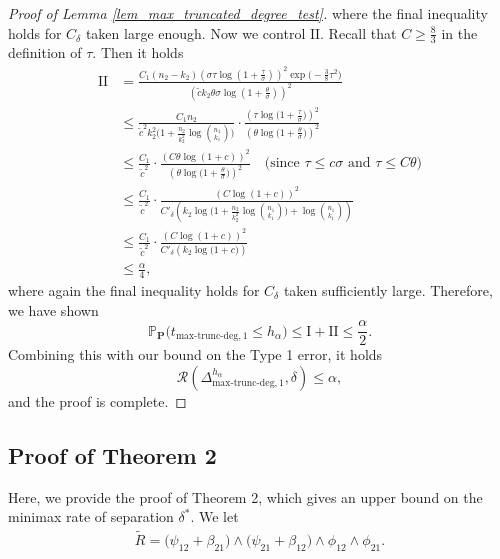 \documentclass{article}
\newcommand{\bbP}{\mathbb{P}}
\newcommand{\bP}{\mathbf{P}}
\newcommand{\cR}{\mathcal{R}}
\newcommand{\chisqmax}{\text{max-trunc-deg}}
\begin{document}
\begin{proof}[Proof of Lemma \ref{lem_max_truncated_degree_test}]
where the final inequality holds for $C_\delta$ taken large enough. Now we control $\text{II}$.  Recall that $C \geq \frac{8}{3}$ in the definition of $\tau$. Then it holds
\begin{align*}
    \text{II} &= \frac{C_1 (n_2 - k_2)\left(\sigma \tau \log(1 + \frac{\tau}{\sigma})\right)^2\exp\big(-\frac38 \tau^2\big)}{\left(\tilde{c}k_2\theta \sigma \log\left(1 + \frac{\theta}{\sigma}\right)\right)^2} \\
    &\leq \frac{C_1n_2}{\tilde{c}^2k_2^2\Big(1 + \frac{n_2}{k_2^2}\log {n_1 \choose k_1}\Big)} \cdot \frac{\left(\tau \log\big(1 + \frac{\tau}{\sigma}\big)\right)^2}{\left(\theta \log\big(1 + \frac{\theta}{\sigma}\big)\right)^2} \\
    &\leq \frac{C_1}{\tilde{c}^2} \cdot \frac{\left(C\theta\log(1 + c)\right)^2}{\left(\theta \log\big(1 + \frac{\theta}{\sigma}\big)\right)^2} \quad \text{(since $\tau \leq c \sigma $ and $\tau \leq C \theta$)} \\
    &\leq \frac{C_1}{\tilde{c}^2} \cdot \frac{ \left(C\log(1 + c)\right)^2}{C'_\delta\left(k_2\log\Big(1 + \frac{n_2}{k_2^2}\log {n_1 \choose k_1}\Big) + \log {n_1 \choose k_1}\right)} \\
    &\leq \frac{C_1}{\tilde{c}^2} \cdot \frac{ \left(C\log(1 + c)\right)^2}{C'_\delta\left(k_2\log\Big(1 + c\Big)\right)} \\
    &\leq \frac{\alpha}{4},
\end{align*}
where again the final inequality holds for $C_\delta$ taken sufficiently large. Therefore, we have shown
\[\bbP_{\bP}\big(t_{\chisqmax, 1} \leq h_\alpha\big) \leq \text{I} + \text{II} \leq \frac{\alpha}{2}.\]
Combining this with our bound on the Type 1 error, it holds
\[\cR(\Delta^{h_\alpha}_{\chisqmax, 1}, \delta) \leq \alpha,\]
and the proof is complete.
\end{proof}

\subsection{Proof of Theorem 2}

Here, we provide the proof of Theorem 2, which gives an upper bound on the minimax rate of separation $\delta^*$.
We let 
\begin{align*}
    \tilde R = \big(\psi_{12} + \beta_{21}\big) \land \big(\psi_{21} + \beta_{12}\big) \land \phi_{12} \land \phi_{21}.
\end{align*}
\end{document}
